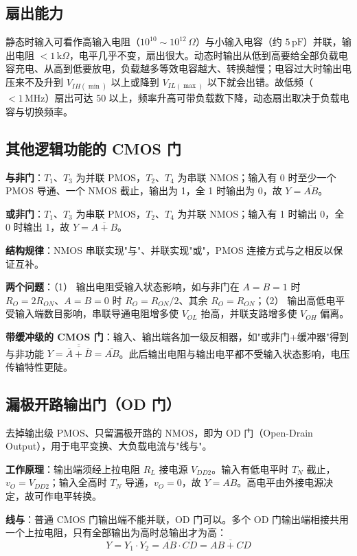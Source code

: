 \subsection{扇出能力}
静态时输入可看作高输入电阻（\(10^{10}\sim10^{12}\,\Omega\)）与小输入电容（约 \(5\,\mathrm{pF}\)）并联，输出电阻 \(<1\,\mathrm{k}\Omega\)，电平几乎不变，扇出很大。动态时输出从低到高要给全部负载电容充电、从高到低要放电，负载越多等效电容越大、转换越慢；电容过大时输出电压来不及升到 \(V_{IH(\min)}\) 以上或降到 \(V_{IL(\max)}\) 以下就会出错。故低频（\(<1\,\mathrm{MHz}\)）扇出可达 50 以上，频率升高可带负载数下降，动态扇出取决于负载电容与切换频率。

\subsection{其他逻辑功能的 CMOS 门}
\textbf{与非门}：\(T_1\)、\(T_3\) 为并联 PMOS，\(T_2\)、\(T_4\) 为串联 NMOS；输入有 0 时至少一个 PMOS 导通、一个 NMOS 截止，输出为 1，全 1 时输出为 0，故 \(Y=\overline{AB}\)。

\textbf{或非门}：\(T_1\)、\(T_3\) 为串联 PMOS，\(T_2\)、\(T_4\) 为并联 NMOS；输入有 1 时输出 0，全 0 时输出 1，故 \(Y=\overline{A+B}\)。

\textbf{结构规律}：NMOS 串联实现"与"、并联实现"或"，PMOS 连接方式与之相反以保证互补。

\textbf{两个问题}：（1） 输出电阻受输入状态影响，如与非门在 \(A=B=1\) 时 \(R_O=2R_{ON}\)、\(A=B=0\) 时 \(R_O=R_{ON}/2\)、其余 \(R_O=R_{ON}\)；（2） 输出高低电平受输入端数目影响，串联导通电阻增多使 \(V_{OL}\) 抬高，并联支路增多使 \(V_{OH}\) 偏离。

\textbf{带缓冲级的 CMOS 门}：输入、输出端各加一级反相器，如"或非门+缓冲器"得到与非功能 \(Y=\overline{\overline{\overline{A}+\overline{B}}}=\overline{AB}\)。此后输出电阻与输出电平都不受输入状态影响，电压传输特性更陡。

\subsection{漏极开路输出门（OD 门）}
去掉输出级 PMOS、只留漏极开路的 NMOS，即为 OD 门（Open-Drain Output），用于电平变换、大负载电流与"线与"。

\textbf{工作原理}：输出端须经上拉电阻 \(R_L\) 接电源 \(V_{DD2}\)。输入有低电平时 \(T_N\) 截止，\(v_O=V_{DD2}\)；输入全高时 \(T_N\) 导通，\(v_O=0\)，故 \(Y=\overline{AB}\)。高电平由外接电源决定，故可作电平转换。

\textbf{线与}：普通 CMOS 门输出端不能并联，OD 门可以。多个 OD 门输出端相接共用一个上拉电阻，只有全部输出为高时总输出才为高：
\[
Y=Y_1\cdot Y_2=\overline{AB}\cdot\overline{CD}=\overline{AB+CD}
\]

